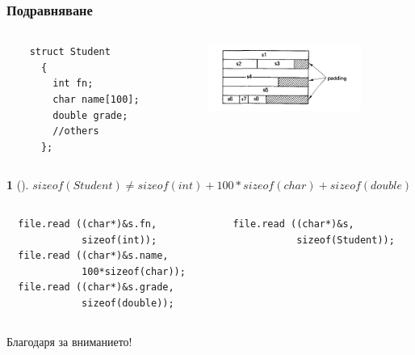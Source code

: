 \documentclass{beamer}
\newtheorem*{remark}{}
\begin{document}
\begin{frame}[fragile]
\frametitle{Подравняване}

\vspace{-20px}



\begin{columns}[t]
  \begin{column}{0.6\textwidth}

\begin{flushleft}
\begin{lstlisting}
    struct Student
      {
        int fn;
        char name[100];
        double grade;
        //others
      };
\end{lstlisting}
\end{flushleft}   

  \end{column}
  \begin{column}{0.4\textwidth}
\begin{flushright}
  \includegraphics[width=5.0cm]{images/padding}
\end{flushright}

  \end{column}
\end{columns}

\begin{remark}[]
    $sizeof(Student) \neq sizeof (int)+100*sizeof(char)+sizeof(double)$
\end{remark}      


\begin{columns}[t]
  \begin{column}{0.5\textwidth}

\begin{flushleft}
\begin{lstlisting}
  file.read ((char*)&s.fn,
             sizeof(int));
  file.read ((char*)&s.name,
             100*sizeof(char));
  file.read ((char*)&s.grade,
             sizeof(double));
\end{lstlisting}
\end{flushleft}   

  \end{column}
  \begin{column}{0.5\textwidth}


\begin{flushleft}
\begin{lstlisting}
  file.read ((char*)&s,
             sizeof(Student));
\end{lstlisting}
\end{flushleft}   

  \end{column}
\end{columns}

\end{frame}


\begin{frame}
\centerline{Благодаря за вниманието!}
\end{frame}
\end{document}
